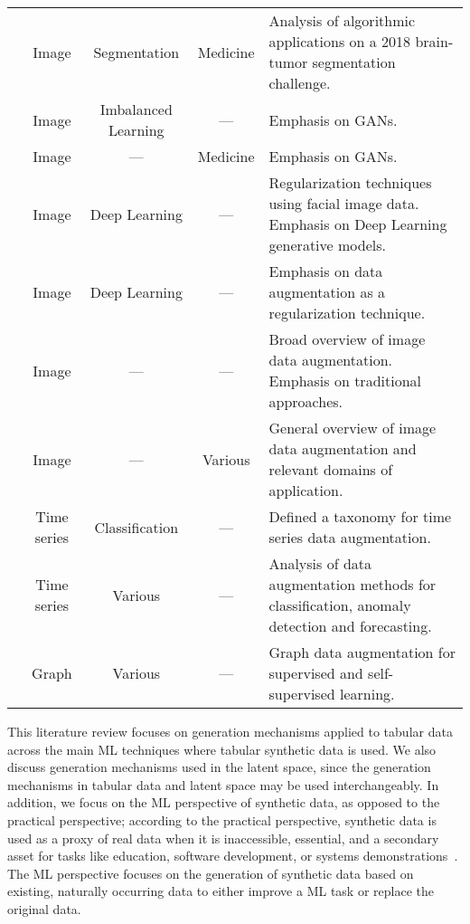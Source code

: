 \begin{table}[t!]
\begin{tabularx}{\textwidth}{@{}rcccX@{}}
        \cite{nalepa2019data} & Image & Segmentation & Medicine & Analysis of
        algorithmic applications on a 2018 brain-tumor segmentation
        challenge.\\

        \cite{sampath2021survey} & Image & Imbalanced Learning &
        --- & Emphasis on GANs. \\

        \cite{yi2019generative} & Image & --- & Medicine & Emphasis on GANs.\\

        \cite{wang2020survey} & Image & Deep Learning & --- & Regularization
        techniques using facial image data. Emphasis on Deep Learning
        generative models.\\

        \cite{shorten2019survey} & Image & Deep Learning & --- & Emphasis on
        data augmentation as a regularization technique.\\

        \cite{khosla2020enhancing} & Image & --- & --- & Broad overview of
        image data augmentation. Emphasis on traditional approaches. \\

        \cite{khalifa2021comprehensive} & Image & --- & Various & General
        overview of image data augmentation and relevant domains of
        application.\\

        \cite{iwana2021empirical} & Time series & Classification & --- &
        Defined a taxonomy for time series data augmentation.\\

        \cite{wen2020time} & Time series & Various & --- & Analysis of data
        augmentation methods for classification, anomaly detection and
        forecasting.\\

        \cite{zhao2022graph} & Graph & Various & --- & Graph data
        augmentation for supervised and self-supervised learning.\\

        \bottomrule
        
    \end{tabularx}
\end{table}
\endgroup

This literature review focuses on generation mechanisms applied to tabular
data across the main ML techniques where tabular synthetic data is used.  We
also discuss generation mechanisms used in the latent space, since the
generation mechanisms in tabular data and latent space may be used
interchangeably. In addition, we focus on the ML perspective of synthetic
data, as opposed to the practical perspective; according to the practical
perspective, synthetic data is used as a proxy of real data when it is
inaccessible, essential, and a secondary asset for tasks like education,
software development, or systems demonstrations~\cite{mannino2019real}.
The ML perspective focuses on the generation of synthetic data based on
existing, naturally occurring data to either improve a ML task or replace the
original data. 

